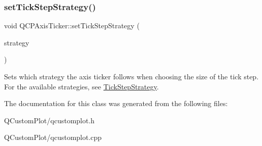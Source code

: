 \subsubsection{\texorpdfstring{set\+Tick\+Step\+Strategy()}{setTickStepStrategy()}}
{\footnotesize\ttfamily void Q\+C\+P\+Axis\+Ticker\+::set\+Tick\+Step\+Strategy (\begin{DoxyParamCaption}\item[{\mbox{\hyperlink{class_q_c_p_axis_ticker_ab6d2f9d9477821623ac9bc4b21ddf49a}{Q\+C\+P\+Axis\+Ticker\+::\+Tick\+Step\+Strategy}}}]{strategy }\end{DoxyParamCaption})}

Sets which strategy the axis ticker follows when choosing the size of the tick step. For the available strategies, see \mbox{\hyperlink{class_q_c_p_axis_ticker_ab6d2f9d9477821623ac9bc4b21ddf49a}{Tick\+Step\+Strategy}}. 

The documentation for this class was generated from the following files\+:\begin{DoxyCompactItemize}
\item 
Q\+Custom\+Plot/qcustomplot.\+h\item 
Q\+Custom\+Plot/qcustomplot.\+cpp\end{DoxyCompactItemize}
